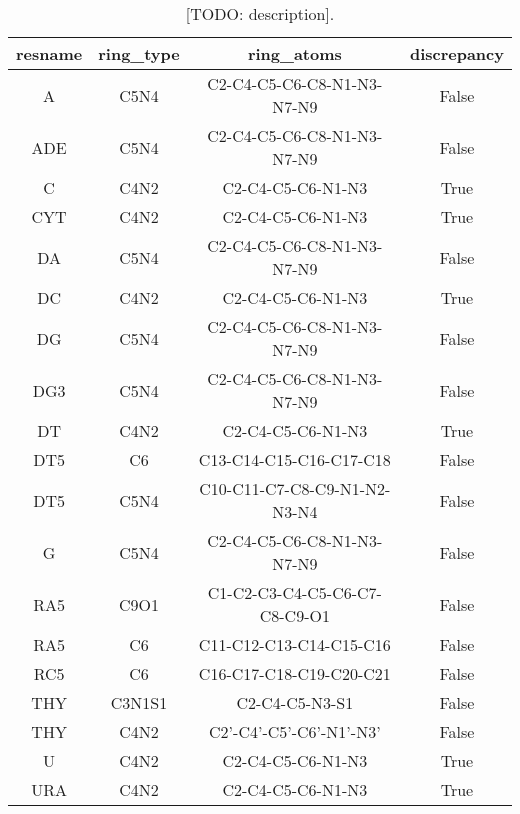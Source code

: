 \begin{table}[H]
  \caption{\label{tab:methods/aromatic_nucleic} [TODO: description].}
  \centering
  \begin{tabular}{cccc}
    \hline
    resname & ring\_type & ring\_atoms                   & discrepancy \\ \hline
    A       & C5N4       & C2-C4-C5-C6-C8-N1-N3-N7-N9    & False       \\
    ADE     & C5N4       & C2-C4-C5-C6-C8-N1-N3-N7-N9    & False       \\
    C       & C4N2       & C2-C4-C5-C6-N1-N3             & True        \\
    CYT     & C4N2       & C2-C4-C5-C6-N1-N3             & True        \\
    DA      & C5N4       & C2-C4-C5-C6-C8-N1-N3-N7-N9    & False       \\
    DC      & C4N2       & C2-C4-C5-C6-N1-N3             & True        \\
    DG      & C5N4       & C2-C4-C5-C6-C8-N1-N3-N7-N9    & False       \\
    DG3     & C5N4       & C2-C4-C5-C6-C8-N1-N3-N7-N9    & False       \\
    DT      & C4N2       & C2-C4-C5-C6-N1-N3             & True        \\
    DT5     & C6         & C13-C14-C15-C16-C17-C18       & False       \\
    DT5     & C5N4       & C10-C11-C7-C8-C9-N1-N2-N3-N4  & False       \\
    G       & C5N4       & C2-C4-C5-C6-C8-N1-N3-N7-N9    & False       \\
    RA5     & C9O1       & C1-C2-C3-C4-C5-C6-C7-C8-C9-O1 & False       \\
    RA5     & C6         & C11-C12-C13-C14-C15-C16       & False       \\
    RC5     & C6         & C16-C17-C18-C19-C20-C21       & False       \\
    THY     & C3N1S1     & C2-C4-C5-N3-S1                & False       \\
    THY     & C4N2       & C2'-C4'-C5'-C6'-N1'-N3'       & False       \\
    U       & C4N2       & C2-C4-C5-C6-N1-N3             & True        \\
    URA     & C4N2       & C2-C4-C5-C6-N1-N3             & True        \\ \hline
  \end{tabular}
\end{table}

